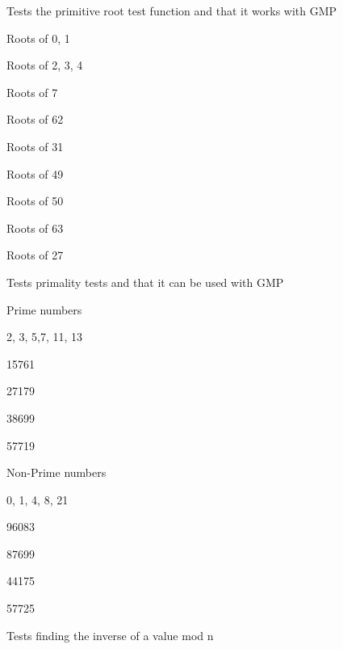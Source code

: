 \begin{DoxyRefList}
\item[\label{test__test000024}%
\hypertarget{test__test000024}{}%
Member \hyperlink{test__primitiveroots_8cpp_ad7fe10ae39aea2430f9fc63ee2863a62}{T\+E\+S\+T\+\_\+\+C\+A\+SE} (\char`\"{}\+The is\+Primitive\+Roots function\char`\"{})]Tests the primitive root test function and that it works with G\+MP
\begin{DoxyItemize}
\item Roots of 0, 1
\item Roots of 2, 3, 4
\item Roots of 7
\item Roots of 62
\item Roots of 31
\item Roots of 49
\item Roots of 50
\item Roots of 63
\item Roots of 27  
\end{DoxyItemize}
\item[\label{test__test000023}%
\hypertarget{test__test000023}{}%
Member \hyperlink{test__isprime_8cpp_ace2c74f6a0edfafbcf788ec9c93fce9b}{T\+E\+S\+T\+\_\+\+C\+A\+SE} (\char`\"{}\+The is\+Prime function\char`\"{})]Tests primality tests and that it can be used with G\+MP
\begin{DoxyItemize}
\item Prime numbers
\begin{DoxyItemize}
\item 2, 3, 5,7, 11, 13
\item 15761
\item 27179
\item 38699
\item 57719
\end{DoxyItemize}
\item Non-\/\+Prime numbers
\begin{DoxyItemize}
\item 0, 1, 4, 8, 21
\item 96083
\item 87699
\item 44175
\item 57725  
\end{DoxyItemize}
\end{DoxyItemize}
\item[\label{test__test000022}%
\hypertarget{test__test000022}{}%
Member \hyperlink{test__inversemod_8cpp_af9bb4330c84776d4bf26c01652f4f86c}{T\+E\+S\+T\+\_\+\+C\+A\+SE} (\char`\"{}\+The inverse\+Mod function\char`\"{})]Tests finding the inverse of a value mod n

\end{DoxyRefList}
